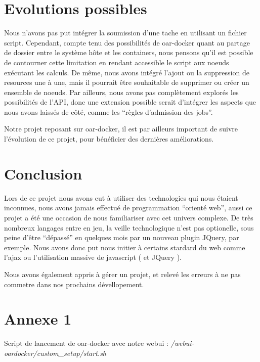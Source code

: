 \documentclass[a4paper,10pt]{article}
\begin{document}
\section{Evolutions possibles}
Nous n'avons pas put intégrer la soumission d'une tache en utilisant un fichier script. Cependant, compte tenu des possibilités de oar-docker quant au partage de dossier entre le système hôte et les containers,
nous pensons qu'il est possible de contourner cette limitation en rendant accessible le script aux noeuds exécutant les calculs. De même, nous avons intégré l'ajout ou la suppression de resources une à une,
mais il pourrait être souhaitable de supprimer ou créer un ensemble de noeuds. Par ailleurs, nous avons pas complètement explorés les possibilités de l'API, donc une extension possible serait d'intégrer les aspects
que nous avons laissés de côté, comme les ``règles d'admission des jobs''.

Notre projet reposant sur oar-docker, il est par ailleurs important de suivre l'évolution de ce projet, pour bénéficier des dernières améliorations.
\section{Conclusion}
Lors de ce projet nous avons eut à utiliser des technologies qui nous étaient inconnues, nous avons jamais effectué de programmation ``orienté web'', aussi ce projet a été une occasion de nous familiariser avec
cet univers complexe. De très nombreux langages entre en jeu, la veille technologique n'est pas optionelle, sous peine d'être ``dépassé'' en quelques mois par un nouveau plugin JQuery, par exemple.
Nous avons donc put nous initier à certains stardard du web comme l'ajax ou l'utilisation massive de javascript ( et JQuery ).

Nous avons également appris à gérer un projet, et relevé les erreurs à ne pas commetre dans nos prochains dévellopement.
\newpage
\section{Annexe 1 \label{annexe1}}
Script de lancement de oar-docker avec notre webui :  \textit{/webui-oardocker/custom\_setup/start.sh}
\end{document}

